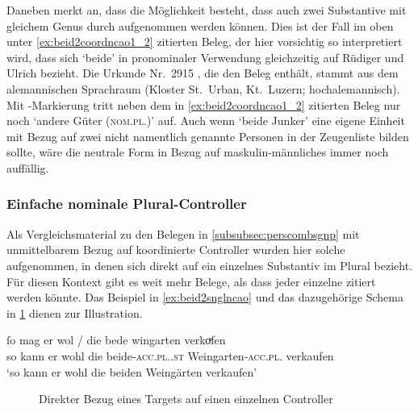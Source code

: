 \label{phsec:jungherren}
Daneben merkt \textcite[384]{paul2007} an, dass die Möglichkeit besteht, dass
auch zwei Substantive mit gleichem Genus durch
 aufgenommen werden können. Dies ist der Fall im oben unter
\cref{ex:beid2coordncao1_2} zitierten Beleg, der hier vorsichtig so
interpretiert wird, dass sich  `beide' in pronominaler Verwendung
gleichzeitig auf Rüdiger und Ulrich bezieht. Die Urkunde Nr.~2915
\autocite[213,14--42]{cao4}, die den Beleg enthält, stammt aus dem alemannischen
Sprachraum (Kloster St.~Urban, Kt.~Luzern; hochalemannisch). Mit
-Markierung tritt neben dem in \cref{ex:beid2coordncao1_2} zitierten
Beleg nur noch  `andere Güter (\textsc{nom.pl.\NeutI})'
\autocites(Nr.~2915)[213.27]{cao4} auf. Auch wenn  `beide
Junker' eine eigene Einheit mit Bezug auf zwei nicht namentlich genannte
Personen in der Zeugenliste bilden sollte, wäre die neutrale Form
 in Bezug auf maskulin-männliches  immer noch
auffällig.

\subsubsection{Einfache nominale Plural-Controller}
\label{subsubsec:persplnp}

Als Vergleichsmaterial zu den Belegen in \cref{subsubsec:perscombsgnp} mit
unmittelbarem Bezug auf koordinierte Controller wurden hier solche aufgenommen,
in denen sich  direkt auf ein einzelnes Substantiv im Plural
bezieht. Für diesen Kontext gibt es weit mehr Belege, als dass jeder einzelne
zitiert werden könnte. Das Beispiel in \cref{ex:beid2snglncao} und das
dazugehörige Schema in \cref{fig:beid2snglncao} dienen zur Illustration.

\begin{exe}
\ex \label{ex:beid2snglncao}
	\gll ſo mag er wol / die bede wingarten \textelp{}
			verkoͮfen \\
		so kann er wohl {} die beide-\textsc{acc.pl.\MascI.st}
			Weingarten-\textsc{acc.pl.\MascI} {} verkaufen \\
	\trans `so kann er wohl die beiden Weingärten \textelp{} verkaufen'
		\parencites(Nr.~1221, Zürich, 1290)[484,9]{cao2}
\end{exe}

\begin{figure}
\caption{Direkter Bezug eines Targets auf einen einzelnen Controller}
\label{fig:beid2snglncao}
\end{figure}

